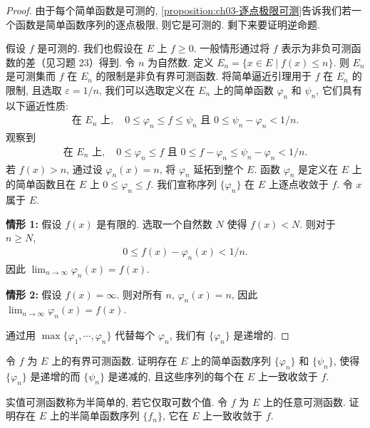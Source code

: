 \documentclass[../../main.tex]{subfiles}
\begin{document}
\begin{proof}
由于每个简单函数是可测的, \cref{proposition:ch03-逐点极限可测}告诉我们若一个函数是简单函数序列的逐点极限, 则它是可测的. 剩下来要证明逆命题.

假设 $f$ 是可测的. 我们也假设在 $E$ 上 $f\geqslant 0$. 一般情形通过将 $f$ 表示为非负可测函数的差（见习题 23）得到. 令 $n$ 为自然数. 定义 $E_{n}=\{x\in E\mid f(x)\leqslant n\}$. 则 $E_{n}$ 是可测集而 $f$ 在 $E_{n}$ 的限制是非负有界可测函数. 将简单逼近引理用于 $f$ 在 $E_{n}$ 的限制, 且选取 $\varepsilon=1/n$, 我们可以选取定义在 $E_{n}$ 上的简单函数 $\varphi_{n}$ 和 $\psi_{n}$, 它们具有以下逼近性质:
\begin{align*}
\text{在 }E_{n}\text{ 上},\quad 0\leqslant\varphi_{n}\leqslant f\leqslant\psi_{n}\text{ 且 }0\leqslant\psi_{n}-\varphi_{n}<1/n.
\end{align*}
观察到
\begin{align}
\text{在 }E_{n}\text{ 上},\quad 0\leqslant\varphi_{n}\leqslant f\text{ 且 }0\leqslant f-\varphi_{n}\leqslant\psi_{n}-\varphi_{n}<1/n.\label{align:ch03-逼近估计}
\end{align}
若 $f(x)>n$, 通过设 $\varphi_{n}(x)=n$, 将 $\varphi_{n}$ 延拓到整个 $E$. 函数 $\varphi_{n}$ 是定义在 $E$ 上的简单函数且在 $E$ 上 $0\leqslant\varphi_{n}\leqslant f$. 我们宣称序列 $\{\varphi_{n}\}$ 在 $E$ 上逐点收敛于 $f$. 令 $x$ 属于 $E$.

\textbf{情形 1:} 假设 $f(x)$ 是有限的. 选取一个自然数 $N$ 使得 $f(x)<N$. 则对于 $n\geqslant N$,
\begin{align*}
0\leqslant f(x)-\varphi_{n}(x)<1/n.
\end{align*}
因此 $\lim_{n\to\infty}\varphi_{n}(x)=f(x)$.

\textbf{情形 2:} 假设 $f(x)=\infty$. 则对所有 $n$, $\varphi_{n}(x)=n$, 因此 $\lim_{n\to\infty}\varphi_{n}(x)=f(x)$.

通过用 $\max\{\varphi_{1},\cdots,\varphi_{n}\}$ 代替每个 $\varphi_{n}$, 我们有 $\{\varphi_{n}\}$ 是递增的.
\end{proof}

\begin{exercise}\label{exercise:ch03-12}
令 $f$ 为 $E$ 上的有界可测函数. 证明存在 $E$ 上的简单函数序列 $\{\varphi_{n}\}$ 和 $\{\psi_{n}\}$, 使得 $\{\varphi_{n}\}$ 是递增的而 $\{\psi_{n}\}$ 是递减的, 且这些序列的每个在 $E$ 上一致收敛于 $f$.
\end{exercise}

\begin{exercise}\label{exercise:ch03-13}
实值可测函数称为半简单的, 若它仅取可数个值. 令 $f$ 为 $E$ 上的任意可测函数. 证明存在 $E$ 上的半简单函数序列 $\{f_{n}\}$, 它在 $E$ 上一致收敛于 $f$.
\end{exercise}
\end{document}
